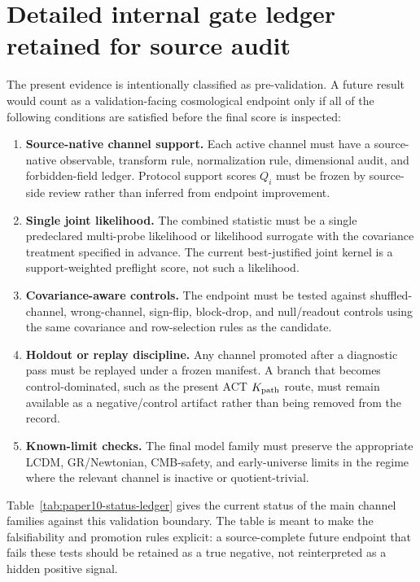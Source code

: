 
\section{Detailed internal gate ledger retained for source audit}

The present evidence is intentionally classified as pre-validation.  A future
result would count as a validation-facing cosmological endpoint only if all of
the following conditions are satisfied before the final score is inspected:

\begin{enumerate}[leftmargin=1.5em]
\item \textbf{Source-native channel support.}  Each active channel must have a
source-native observable, transform rule, normalization rule, dimensional audit,
and forbidden-field ledger.  Protocol support scores \(Q_i\) must be frozen by
source-side review rather than inferred from endpoint improvement.
\item \textbf{Single joint likelihood.}  The combined statistic must be a
single predeclared multi-probe likelihood or likelihood surrogate with the
covariance treatment specified in advance.  The current best-justified joint
kernel is a support-weighted preflight score, not such a likelihood.
\item \textbf{Covariance-aware controls.}  The endpoint must be tested against
shuffled-channel, wrong-channel, sign-flip, block-drop, and null/readout
controls using the same covariance and row-selection rules as the candidate.
\item \textbf{Holdout or replay discipline.}  Any channel promoted after a
diagnostic pass must be replayed under a frozen manifest.  A branch that becomes
control-dominated, such as the present ACT \(K_{\rm path}\) route, must remain
available as a negative/control artifact rather than being removed from the
record.
\item \textbf{Known-limit checks.}  The final model family must preserve the
appropriate LCDM, GR/Newtonian, CMB-safety, and early-universe limits in the
regime where the relevant channel is inactive or quotient-trivial.
\end{enumerate}

Table~\ref{tab:paper10-status-ledger} gives the current status of the main
channel families against this validation boundary.  The table is meant to make
the falsifiability and promotion rules explicit: a source-complete future
endpoint that fails these tests should be retained as a true negative, not
reinterpreted as a hidden positive signal.


